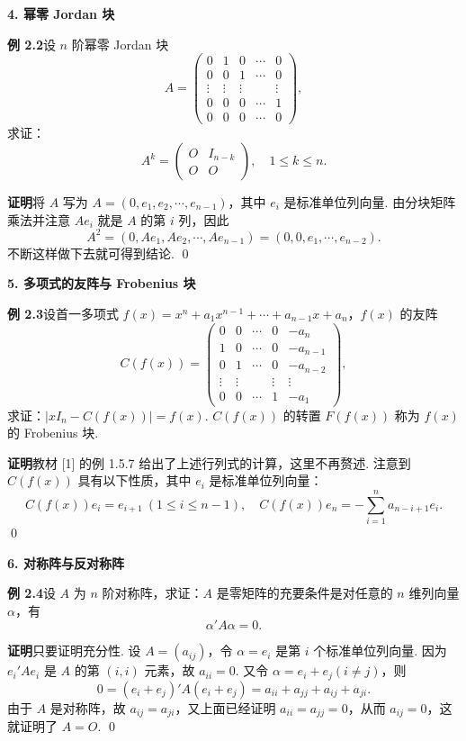 \documentclass[UTF8, 12pt, fontset=fandol, oneside]{ctexart}
\begin{document}
\noindent\textbf{4. 幂零 Jordan 块}

\noindent\textbf{例 2.2}\quad 设 $n$ 阶幂零 Jordan 块
\[
A=
\left(
\begin{array}{ccccc}
0 & 1 & 0 & \cdots & 0\\
0 & 0 & 1 & \cdots & 0\\
\vdots & \vdots & \vdots & & \vdots\\
0 & 0 & 0 & \cdots & 1\\
0 & 0 & 0 & \cdots & 0
\end{array}
\right),
\]
求证：
\[
A^k=
\left(
\begin{array}{cc}
O & I_{n-k}\\
O & O
\end{array}
\right),\quad 1\le k\le n.
\]

\noindent\textbf{证明}\quad 将 $A$ 写为 $A=(0,e_1,e_2,\cdots,e_{n-1})$，其中 $e_i$ 是标准单位列向量. 由分块矩阵乘法并注意 $Ae_i$ 就是 $A$ 的第 $i$ 列，因此
\[
A^2=(0,Ae_1,Ae_2,\cdots,Ae_{n-1})=(0,0,e_1,\cdots,e_{n-2}).
\]
不断这样做下去就可得到结论. \qed

\noindent\textbf{5. 多项式的友阵与 Frobenius 块}

\noindent\textbf{例 2.3}\quad 设首一多项式 $f(x)=x^n+a_1x^{n-1}+\cdots+a_{n-1}x+a_n$，$f(x)$ 的友阵
\[
C(f(x))=
\left(
\begin{array}{ccccc}
0 & 0 & \cdots & 0 & -a_n\\
1 & 0 & \cdots & 0 & -a_{n-1}\\
0 & 1 & \cdots & 0 & -a_{n-2}\\
\vdots & \vdots & & \vdots & \vdots\\
0 & 0 & \cdots & 1 & -a_1
\end{array}
\right),
\]
求证：$|xI_n-C(f(x))|=f(x)$. $C(f(x))$ 的转置 $F(f(x))$ 称为 $f(x)$ 的 Frobenius 块.

\noindent\textbf{证明}\quad 教材 [1] 的例 1.5.7 给出了上述行列式的计算，这里不再赘述. 注意到 $C(f(x))$ 具有以下性质，其中 $e_i$ 是标准单位列向量：
\[
C(f(x))e_i=e_{i+1}\ (1\le i\le n-1),\quad
C(f(x))e_n=-\sum_{i=1}^n a_{n-i+1}e_i.
\]
\qed

\noindent\textbf{6. 对称阵与反对称阵}

\noindent\textbf{例 2.4}\quad 设 $A$ 为 $n$ 阶对称阵，求证：$A$ 是零矩阵的充要条件是对任意的 $n$ 维列向量 $\alpha$，有
\[
\alpha' A\alpha=0.
\]

\noindent\textbf{证明}\quad 只要证明充分性. 设 $A=(a_{ij})$，令 $\alpha=e_i$ 是第 $i$ 个标准单位列向量. 因为 $e_i'Ae_i$ 是 $A$ 的第 $(i,i)$ 元素，故 $a_{ii}=0$. 又令 $\alpha=e_i+e_j(i\ne j)$，则
\[
0=(e_i+e_j)'A(e_i+e_j)=a_{ii}+a_{jj}+a_{ij}+a_{ji}.
\]
由于 $A$ 是对称阵，故 $a_{ij}=a_{ji}$，又上面已经证明 $a_{ii}=a_{jj}=0$，从而 $a_{ij}=0$，这就证明了 $A=O$. \qed
\end{document}
